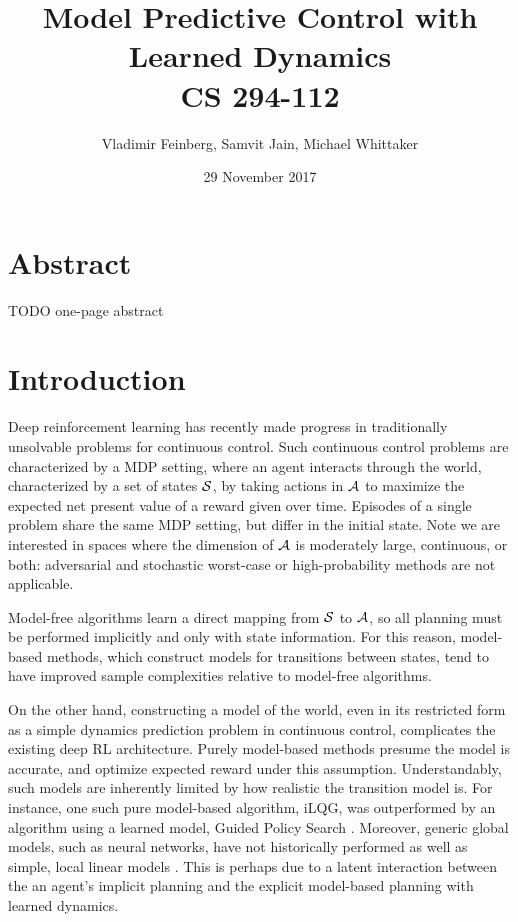 \documentclass{article}
\title{Model Predictive Control with Learned Dynamics\\\large CS 294-112}
\author{Vladimir Feinberg, Samvit Jain, Michael Whittaker}
\date{29 November 2017}
\let\Oldsection\section
\renewcommand{\section}{\FloatBarrier\Oldsection}
\begin{document}
	
\maketitle

\section{Abstract}

TODO one-page abstract

\section{Introduction}

Deep reinforcement learning has recently made progress in traditionally unsolvable problems for continuous control. Such continuous control problems are characterized by a MDP setting, where an agent interacts through the world, characterized by a set of states $\mathcal{S}$, by taking actions in $\mathcal{A}$ to maximize the expected net present value of a reward given over time. Episodes of a single problem share the same MDP setting, but differ in the initial state. Note we are interested in spaces where the dimension of $\mathcal{A}$ is moderately large, continuous, or both: adversarial and stochastic worst-case or high-probability methods are not applicable.

Model-free algorithms learn a direct mapping from $\mathcal{S}$ to $\mathcal{A}$, so all planning must be performed implicitly and only with state information. For this reason, model-based methods, which construct models for transitions between states, tend to have improved sample complexities relative to model-free algorithms.

On the other hand, constructing a model of the world, even in its restricted form as a simple dynamics prediction problem in continuous control, complicates the existing deep RL architecture. Purely model-based methods presume the model is accurate, and optimize expected reward under this assumption. Understandably, such models are inherently limited by how realistic the transition model is. For instance, one such pure model-based algorithm, iLQG, was outperformed by an algorithm using a learned model, Guided Policy Search \cite{levine2014learning}. Moreover, generic global models, such as neural networks, have not historically performed as well as simple, local linear models \cite{gu2016continuous}. This is perhaps due to a latent interaction between the an agent's implicit planning and the explicit model-based planning with learned dynamics.
\end{document}
